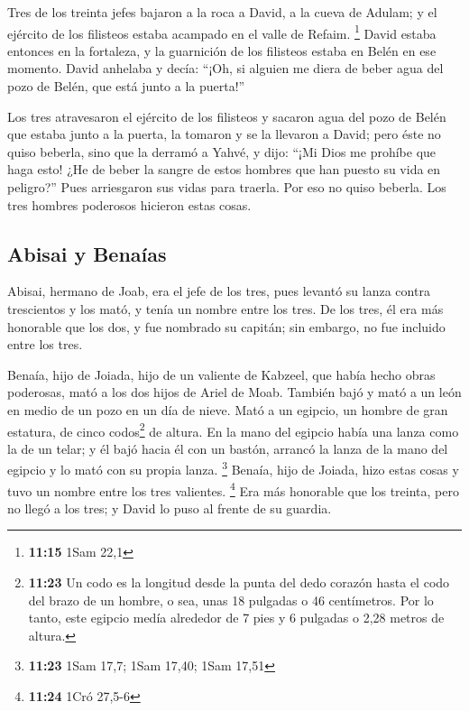 \begin{paracol}{2}
 Tres de los treinta jefes bajaron a la roca a David, a
la cueva de Adulam; y el ejército de los filisteos estaba acampado en el
valle de Refaim. \footnote{\textbf{11:15} 1Sam 22,1} 
David estaba entonces en la fortaleza, y la guarnición de los filisteos
estaba en Belén en ese momento.  David anhelaba y decía:
``¡Oh, si alguien me diera de beber agua del pozo de Belén, que está
junto a la puerta!''

 Los tres atravesaron el ejército de los filisteos y
sacaron agua del pozo de Belén que estaba junto a la puerta, la tomaron
y se la llevaron a David; pero éste no quiso beberla, sino que la
derramó a Yahvé,  y dijo: ``¡Mi Dios me prohíbe que haga
esto! ¿He de beber la sangre de estos hombres que han puesto su vida en
peligro?'' Pues arriesgaron sus vidas para traerla. Por eso no quiso
beberla. Los tres hombres poderosos hicieron estas cosas.

\hypertarget{abisai-y-benauxedas}{%
\subsection{Abisai y Benaías}\label{abisai-y-benauxedas}}

 Abisai, hermano de Joab, era el jefe de los tres, pues
levantó su lanza contra trescientos y los mató, y tenía un nombre entre
los tres.  De los tres, él era más honorable que los dos,
y fue nombrado su capitán; sin embargo, no fue incluido entre los tres.

 Benaía, hijo de Joiada, hijo de un valiente de Kabzeel,
que había hecho obras poderosas, mató a los dos hijos de Ariel de Moab.
También bajó y mató a un león en medio de un pozo en un día de nieve.
 Mató a un egipcio, un hombre de gran estatura, de cinco
codos\footnote{\textbf{11:23} Un codo es la longitud desde la punta del
  dedo corazón hasta el codo del brazo de un hombre, o sea, unas 18
  pulgadas o 46 centímetros. Por lo tanto, este egipcio medía alrededor
  de 7 pies y 6 pulgadas o 2,28 metros de altura.} de altura. En la mano
del egipcio había una lanza como la de un telar; y él bajó hacia él con
un bastón, arrancó la lanza de la mano del egipcio y lo mató con su
propia lanza. \footnote{\textbf{11:23} 1Sam 17,7; 1Sam 17,40; 1Sam 17,51}
 Benaía, hijo de Joiada, hizo estas cosas y tuvo un
nombre entre los tres valientes. \footnote{\textbf{11:24} 1Cró 27,5-6}
 Era más honorable que los treinta, pero no llegó a los
tres; y David lo puso al frente de su guardia.


\end{paracol}
